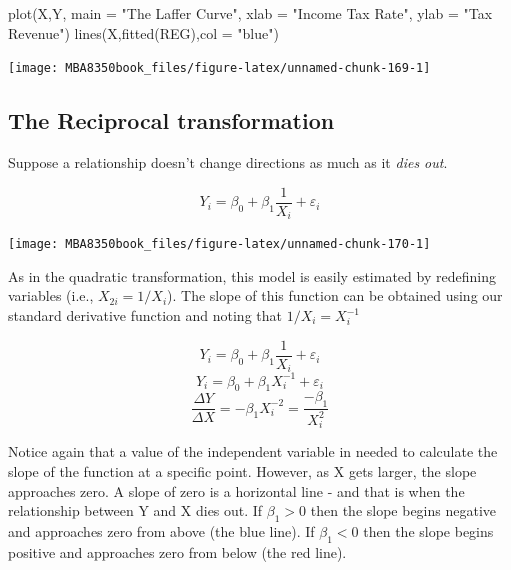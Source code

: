 \documentclass[
]{book}
\newenvironment{Shaded}{\begin{snugshade}}{\end{snugshade}}
\newcommand{\AttributeTok}[1]{\textcolor[rgb]{0.77,0.63,0.00}{#1}}
\newcommand{\FunctionTok}[1]{\textcolor[rgb]{0.00,0.00,0.00}{#1}}
\newcommand{\NormalTok}[1]{#1}
\newcommand{\StringTok}[1]{\textcolor[rgb]{0.31,0.60,0.02}{#1}}
\begin{document}
\begin{Shaded}
\begin{Highlighting}[]
\FunctionTok{plot}\NormalTok{(X,Y,}
     \AttributeTok{main =} \StringTok{"The Laffer Curve"}\NormalTok{,}
     \AttributeTok{xlab =} \StringTok{"Income Tax Rate"}\NormalTok{,}
     \AttributeTok{ylab =} \StringTok{"Tax Revenue"}\NormalTok{)}
\FunctionTok{lines}\NormalTok{(X,}\FunctionTok{fitted}\NormalTok{(REG),}\AttributeTok{col =} \StringTok{"blue"}\NormalTok{)}
\end{Highlighting}
\end{Shaded}

\begin{center}\texttt{[image: MBA8350book\_files/figure-latex/unnamed-chunk-169-1]} \end{center}

\hypertarget{the-reciprocal-transformation}{%
\subsection{The Reciprocal transformation}\label{the-reciprocal-transformation}}

Suppose a relationship doesn't change directions as much as it \emph{dies out}.

\[Y_i = \beta_0 + \beta_1 \frac{1}{X_i} + \varepsilon_i\]

\begin{center}\texttt{[image: MBA8350book\_files/figure-latex/unnamed-chunk-170-1]} \end{center}

As in the quadratic transformation, this model is easily estimated by redefining variables (i.e., \(X_{2i}=1/X_i\)). The slope of this function can be obtained using our standard derivative function and noting that \(1/X_i = X_i^{-1}\)

\[Y_i = \beta_0 + \beta_1 \frac{1}{X_i} + \varepsilon_i\]
\[Y_i = \beta_0 + \beta_1 X_i^{-1} + \varepsilon_i\]
\[\frac{\Delta Y}{\Delta X} = -\beta_1 X_i^{-2}=\frac{-\beta_1} {X_i^{2}}\]

Notice again that a value of the independent variable in needed to calculate the slope of the function at a specific point. However, as X gets larger, the slope approaches zero. A slope of zero is a horizontal line - and that is when the relationship between Y and X dies out. If \(\beta_1>0\) then the slope begins negative and approaches zero from above (the blue line). If \(\beta_1<0\) then the slope begins positive and approaches zero from below (the red line).
\end{document}
